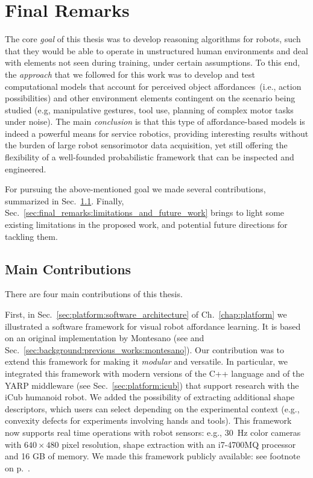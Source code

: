 
\chapter{Final Remarks}
\label{chap:final_remarks}

The core \emph{goal} of this thesis was to develop reasoning algorithms for robots, such that they would be able to operate in unstructured human environments and deal with elements not seen during training, under certain assumptions.
To this end, the \emph{approach} that we followed for this work was to develop and test computational models that account for perceived object affordances~(i.e., action possibilities) and other environment elements contingent on the scenario being studied (e.g, manipulative gestures, tool use, planning of complex motor tasks under noise).
The main \emph{conclusion} is that this type of affordance-based models is indeed a powerful means for service robotics, providing interesting results without the burden of large robot sensorimotor data acquisition, yet still offering the flexibility of a well-founded probabilistic framework that can be inspected and engineered.

For pursuing the above-mentioned goal we made several contributions, summarized in Sec.~\ref{sec:final_remarks:main_contributions}.
Finally, Sec.~\ref{sec:final_remarks:limitations_and_future_work} brings to light some existing limitations in the proposed work, and potential future directions for tackling them.

\section{Main Contributions}
\label{sec:final_remarks:main_contributions}

There are four main contributions of this thesis.

First, in Sec.~\ref{sec:platform:software_architecture} of Ch.~\ref{chap:platform} we illustrated a software framework for visual robot affordance learning.
It is based on an original implementation by Montesano (see \cite{montesano:2008} and Sec.~\ref{sec:background:previous_works:montesano}).
Our contribution was to extend this framework for making it \emph{modular} and versatile.
In particular, we integrated this framework with modern versions of the C++ language and of the \ac{YARP} middleware (see Sec.~\ref{sec:platform:icub}) that support research with the iCub humanoid robot.
We added the possibility of extracting additional shape descriptors, which users can select depending on the experimental context (e.g., convexity defects for experiments involving hands and tools).
This framework now supports real time operations with robot sensors:
e.g., 30~Hz color cameras with $640\times480$ pixel resolution,
shape extraction with an i7-4700MQ processor and 16 GB of memory.
We made this framework publicly available: see footnote~ on p.~\pageref{footnote:robot-affordances_url}.

